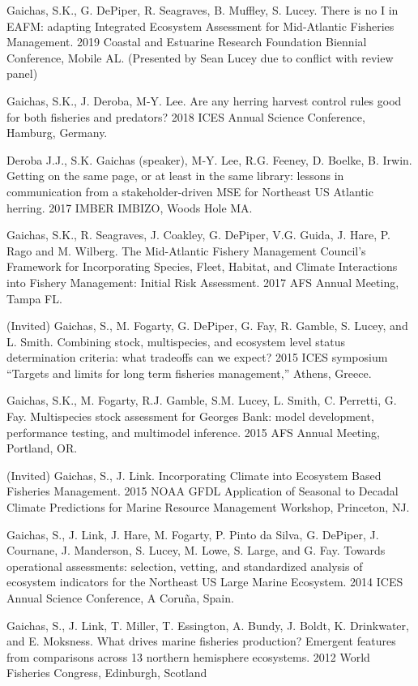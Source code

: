 \documentclass[11pt, a4paper]{awesome-cv}
\begin{document}
Gaichas, S.K., G. DePiper, R. Seagraves, B. Muffley, S. Lucey. There is
no I in EAFM: adapting Integrated Ecosystem Assessment for Mid-Atlantic
Fisheries Management. 2019 Coastal and Estuarine Research Foundation
Biennial Conference, Mobile AL. (Presented by Sean Lucey due to conflict
with review panel)

Gaichas, S.K., J. Deroba, M-Y. Lee. Are any herring harvest control
rules good for both fisheries and predators? 2018 ICES Annual Science
Conference, Hamburg, Germany.

Deroba J.J., S.K. Gaichas (speaker), M‐Y. Lee, R.G. Feeney, D. Boelke,
B. Irwin. Getting on the same page, or at least in the same library:
lessons in communication from a stakeholder-driven MSE for Northeast US
Atlantic herring. 2017 IMBER IMBIZO, Woods Hole MA.

Gaichas, S.K., R. Seagraves, J. Coakley, G. DePiper, V.G. Guida, J.
Hare, P. Rago and M. Wilberg. The Mid-Atlantic Fishery Management
Council's Framework for Incorporating Species, Fleet, Habitat, and
Climate Interactions into Fishery Management: Initial Risk Assessment.
2017 AFS Annual Meeting, Tampa FL.

(Invited) Gaichas, S., M. Fogarty, G. DePiper, G. Fay, R. Gamble, S.
Lucey, and L. Smith. Combining stock, multispecies, and ecosystem level
status determination criteria: what tradeoffs can we expect? 2015 ICES
symposium ``Targets and limits for long term fisheries management,''
Athens, Greece.

Gaichas, S.K., M. Fogarty, R.J. Gamble, S.M. Lucey, L. Smith, C.
Perretti, G. Fay. Multispecies stock assessment for Georges Bank: model
development, performance testing, and multimodel inference. 2015 AFS
Annual Meeting, Portland, OR.

(Invited) Gaichas, S., J. Link. Incorporating Climate into Ecosystem
Based Fisheries Management. 2015 NOAA GFDL Application of Seasonal to
Decadal Climate Predictions for Marine Resource Management Workshop,
Princeton, NJ.

Gaichas, S., J. Link, J. Hare, M. Fogarty, P. Pinto da Silva, G.
DePiper, J. Cournane, J. Manderson, S. Lucey, M. Lowe, S. Large, and G.
Fay. Towards operational assessments: selection, vetting, and
standardized analysis of ecosystem indicators for the Northeast US Large
Marine Ecosystem. 2014 ICES Annual Science Conference, A Coruña, Spain.

Gaichas, S., J. Link, T. Miller, T. Essington, A. Bundy, J. Boldt, K.
Drinkwater, and E. Moksness. What drives marine fisheries production?
Emergent features from comparisons across 13 northern hemisphere
ecosystems. 2012 World Fisheries Congress, Edinburgh, Scotland
\end{document}

